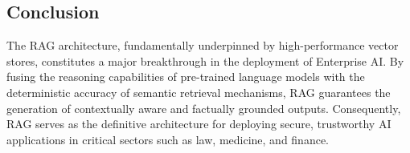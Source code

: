 \subsection{Conclusion}
The RAG architecture, fundamentally underpinned by high-performance vector stores, constitutes a major breakthrough in the deployment of Enterprise AI. By fusing the reasoning capabilities of pre-trained language models with the deterministic accuracy of semantic retrieval mechanisms, RAG guarantees the generation of contextually aware and factually grounded outputs. Consequently, RAG serves as the definitive architecture for deploying secure, trustworthy AI applications in critical sectors such as law, medicine, and finance.
